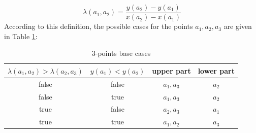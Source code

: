 \documentclass[a4paper,english,numberwithinsect,notab]{eurocg20-submission}
\begin{document}
	\begin{equation}
	\lambda(a_1, a_2)=\frac{y(a_2)-y(a_1)}{x(a_2)-x(a_1)}
	\end{equation}
	According to this definition, the possible cases for the points $a_1,a_2,a_3$ are given in Table \ref{table:3points}:
	
	\begin{table}[htbp]
	\caption{3-points base cases}
	\label{table:3points}
	\begin{center}
		\begin{tabular}{|c|c|c|c|}
			\hline
			\textbf{$\lambda(a_1, a_2) > \lambda(a_2, a_3)$} & \textbf{$y(a_1) < y(a_2)$} & upper part & lower part\\
			\hline
			false & false & $a_1, a_3$ & $a_2$ \\
			\hline
			false & true & $a_1, a_3$ & $a_2$ \\
			\hline
			true & false & $a_2, a_3$ & $a_1$ \\
			\hline
			true & true & $a_1, a_2$ & $a_3$ \\
			\hline
		\end{tabular} 
	\end{center}
	\end{table} 



	
	
	
\end{document}
